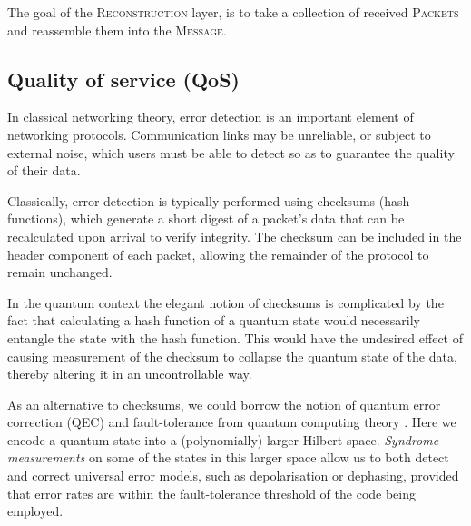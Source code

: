 \documentclass[aps,rmp,twocolumn,amsmath,amssymb,nofootinbib,superscriptaddress,longbibliography,floatfix,table-of-contents,eqsecnum]{revtex4-1}
\begin{document}
\begin{table}[!htb]
\caption{The goal of the \textsc{Reconstruction} layer, is to take a collection of received \textsc{Packets} and reassemble them into the \textsc{Message}.} \label{alg:reconstruction}
\end{table}

%
%

\subsection{Quality of service (QoS)} \label{sec:QOS} 

In classical networking theory, error detection is an important element of networking protocols. Communication links may be unreliable, or subject to external noise, which users must be able to detect so as to guarantee the quality of their data.

Classically, error detection is typically performed using checksums (hash functions), which generate a short digest of a packet's data that can be recalculated upon arrival to verify integrity. The checksum can be included in the header component of each packet, allowing the remainder of the protocol to remain unchanged.

In the quantum context the elegant notion of checksums is complicated by the fact that calculating a hash function of a quantum state would necessarily entangle the state with the hash function. This would have the undesired effect of causing measurement of the checksum to collapse the quantum state of the data, thereby altering it in an uncontrollable way.

As an alternative to checksums, we could borrow the notion of quantum error correction (QEC) and fault-tolerance from quantum computing theory \cite{???}. Here we encode a quantum state into a (polynomially) larger Hilbert space. \textit{Syndrome measurements} on some of the states in this larger space allow us to both detect and correct universal error models, such as depolarisation or dephasing, provided that error rates are within the fault-tolerance threshold of the code being employed.
\end{document}
